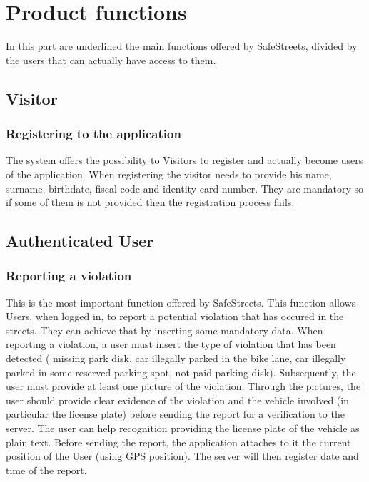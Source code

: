 \documentclass[a4paper]{report}
\begin{document}
\section{Product functions}
In this part are underlined the main functions offered by SafeStreets, divided by the users that can actually have access to them.

\subsection{Visitor}

\subsubsection{Registering to the application}

The system offers the possibility to Visitors to register and actually become users of the application. When registering the visitor needs to provide his name, surname, birthdate, fiscal code and identity card number. They are mandatory so if some of them is not provided then the registration process fails.
 
\subsection{Authenticated User}

\subsubsection{Reporting a violation}
This is the most important function offered by SafeStreets. This function allows Users, when logged in, to report a potential violation that has occured in the streets. 
They can achieve that by inserting some mandatory data. When reporting a violation, a user must insert the type of violation that has been detected ( missing park disk, car illegally parked in the bike lane, car illegally parked in some reserved parking spot, not paid parking disk).
Subsequently, the user must provide at least one picture of the violation. Through the pictures, the user should provide clear evidence of the violation and the vehicle involved (in particular the license plate) before sending the report for a verification to the server. The user can help recognition providing the license plate of the vehicle as plain text. Before sending the report, the application attaches to it the current position of the User (using GPS position). The server will then register date and time of the report.
\end{document}
